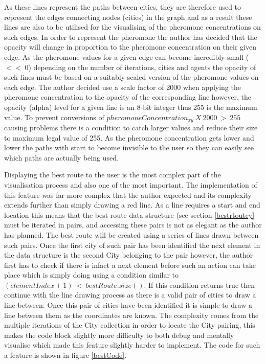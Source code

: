 As these lines represent the paths between cities, they are therefore used to represent the edges connecting nodes (cities) in the graph and as a result these lines are also to be utilised for the visualising of the pheromone concentrations on such edges. In order to represent the pheromone the author has decided that the opacity will change in proportion to the pheromone concentration on their given edge. As the pheromone values for a given edge can become incredibly small ($<<\ 0$) depending on the number of iterations, cities and agents the opacity of such lines must be based on a suitably scaled version of the pheromone values on each edge. The author decided use a scale factor of 2000 when applying the pheromone concentration to the opacity of the corresponding line however, the opacity (alpha) level for a given line is an 8-bit integer thus 255 is the maximum value. To prevent conversions of $pheromoneConcentration_{xy}\ X\ 2000\ >\ 255$ causing problems there is a condition to catch larger values and reduce their size to maximum legal value of 255. As the pheromone concentration gets lower and lower the paths with start to become invisible to the user so they can easily see which paths are actually being used.

Displaying the best route to the user is the most complex part of the visualisation process and also one of the most important. The implementation of this feature was far more complex that the author expected and its complexity extends further than simply drawing a red line. As a line requires a start and end location this means that the best route data structure (see section \ref{bestrtoutey} must be iterated in pairs, and accessing these pairs is not as elegant as the author has planned. The best route will be created using a series of lines drawn between such pairs. Once the first city of such pair has been identified the next element in the data structure is the second City belonging to the pair however, the author first has to check if there is infact a next element before such an action can take place which is simply doing using a condition similar to $(elementIndex + 1)\ <\ bestRoute.size()$. If this condition returns true then continue with the line drawing process as there is a valid pair of cities to draw a line between. Once this pair of cities have been identified it is simple to draw a line between them as the coordinates are known. The complexity comes from the multiple iterations of the City collection in order to locate the City pairing, this makes the code block slightly more difficulty to both debug and mentally visualise which made this feature slightly harder to implement. The code for such a feature is shown in figure \ref{bestCode}.

